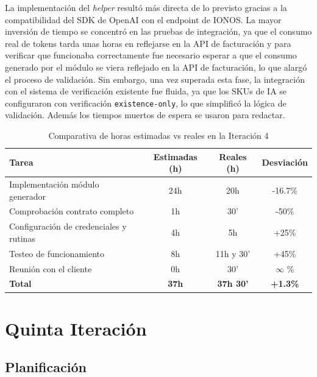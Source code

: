 La implementación del \textit{helper} resultó más directa de lo previsto gracias a la compatibilidad del SDK de OpenAI con el endpoint de IONOS. La mayor inversión de tiempo se concentró en las pruebas de integración, ya que el consumo real de tokens tarda unas horas en reflejarse en la API de facturación y para verificar que funcionaba correctamente fue necesario esperar a que el consumo generado por el módulo se viera reflejado en la API de facturación, lo que alargó el proceso de validación. Sin embargo, una vez superada esta fase, la integración con el sistema de verificación existente fue fluida, ya que los SKUs de IA se configuraron con verificación \texttt{existence-only}, lo que simplificó la lógica de validación. Además los tiempos muertos de espera se usaron para redactar.

\begin{table}[H]
    \centering
    \begin{tabular}{|l|c|c|c|}
        \hline
        \textbf{Tarea} & \textbf{Estimadas (h)} & \textbf{Reales (h)} & \textbf{Desviación} \\
        \hline
        Implementación módulo generador     & 24h & 20h  & -16.7\% \\
        Comprobación contrato completo      & 1h  & 30'  & -50\%   \\
        Configuración de credenciales y rutinas & 4h & 5h & +25\%  \\
        Testeo de funcionamiento            & 8h  & 11h y 30' & +45\%   \\
        Reunión con el cliente                   & 0h  & 30'   & $\infty$ \%   \\
        \hline
        \textbf{Total} & \textbf{37h} & \textbf{37h 30'} & \textbf{+1.3\%} \\
        \hline
    \end{tabular}
    \caption{Comparativa de horas estimadas vs reales en la Iteración 4}
    \label{tab:horas-iteracion4}
\end{table}


\section{Quinta Iteración}

\subsection{Planificación}

